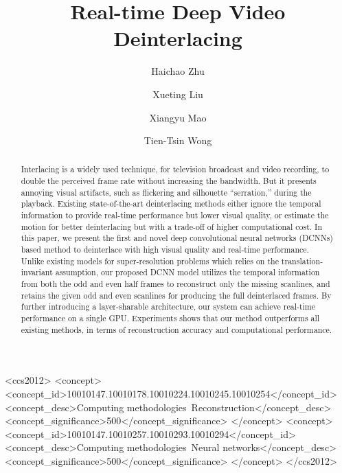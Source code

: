 \documentclass[acmtog]{acmart}
\begin{document}
\title{Real-time Deep Video Deinterlacing}

\author{Haichao Zhu}

\author{Xueting Liu}

\author{Xiangyu Mao}

\author{Tien-Tsin Wong}




\begin{abstract}
Interlacing is a widely used technique, for television broadcast and video
recording, to double the perceived frame rate without increasing the bandwidth.
But it presents annoying visual artifacts, such as flickering and silhouette
``serration,''  during the playback. Existing state-of-the-art deinterlacing
methods either ignore the temporal information to provide real-time performance
but lower visual quality, or estimate the motion for better deinterlacing but
with a trade-off of higher computational cost. In this paper, we present 
the first and novel deep convolutional neural networks (DCNNs) based method to
deinterlace with high visual quality and real-time performance. Unlike existing
models for super-resolution problems which relies on the translation-invariant
assumption, our proposed DCNN model utilizes the temporal information from both
the odd and even half frames to reconstruct only the missing scanlines, and retains
the given odd and even scanlines for producing the full deinterlaced frames.
By further introducing a layer-sharable architecture, our system can achieve
real-time performance on a single GPU. Experiments shows that our
method outperforms all existing methods, in terms of 
reconstruction accuracy and computational performance. \end{abstract}




\begin{CCSXML}
	<ccs2012>
	<concept>
	<concept_id>10010147.10010178.10010224.10010245.10010254</concept_id>
	<concept_desc>Computing methodologies~Reconstruction</concept_desc>
	<concept_significance>500</concept_significance>
	</concept>
	<concept>
	<concept_id>10010147.10010257.10010293.10010294</concept_id>
	<concept_desc>Computing methodologies~Neural networks</concept_desc>
	<concept_significance>500</concept_significance>
	</concept>
	</ccs2012>
\end{CCSXML}
\end{document}
